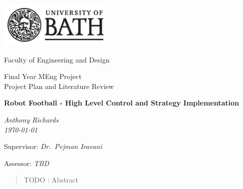 \begin{titlepage}
  \setlength{\parindent}{0cm}

  \includegraphics[width=200px]{Images/uob-logo-black-transparent}

  \Large
  Faculty of Engineering and Design

  \vspace{80pt}

  \LARGE
  Final Year MEng Project \\
  Project Plan and Literature Review

  \vspace{80pt}
  \textbf{Robot Football - High Level Control and Strategy Implementation}

  \vspace{10pt}
  \emph{Anthony Richards} \\
  \emph{\today}

  \vspace{80pt}
  Supervisor: \emph{Dr.~Pejman Iravani}

  \vspace{10pt}
  Assessor: \emph{TBD}
\end{titlepage}


\begin{abstract}
\acresetall
TODO : Abstract
\end{abstract}

\tableofcontents

\acresetall

\cleardoublepage

